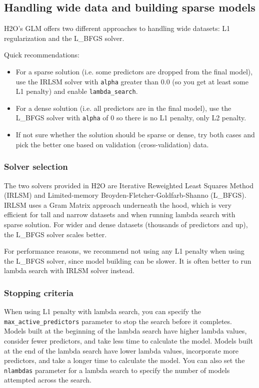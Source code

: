 \subsection{Handling wide data and building sparse models}

H2O's GLM offers two different approaches to handling wide datasets:  L1 regularization and the L\_BFGS solver.

Quick recommendations:

\begin{itemize}
\item For a sparse solution (i.e. some predictors are dropped from the final model), use the IRLSM solver with 
      \texttt{alpha} greater than 0.0 (so you get at least some L1 penalty) and enable \texttt{lambda\_search}.

\item For a dense solution (i.e. all predictors are in the final model), use the L\_BFGS solver with
      \texttt{alpha} of 0 so there is no L1 penalty, only L2 penalty.
\item If not sure whether the solution should be sparse or dense, try both cases and pick the better one based on validation (cross-validation) data.      
\end{itemize}

\subsubsection{Solver selection}

The two solvers provided in H2O are Iterative Reweighted Least Squares Method (IRLSM) and Limited-memory Broyden-Fletcher-Goldfarb-Shanno (L\_BFGS).  IRLSM uses
a Gram Matrix approach underneath the hood, which is very efficient for tall and narrow datasets and when running lambda search with sparse solution.  For wider and dense
datasets (thousands of predictors and up), the L\_BFGS solver scales better.

For performance reasons, we recommend not using any L1 penalty when using the L\_BFGS solver, since
model building can be slower. It is often better to run lambda search with IRLSM solver instead.

\subsubsection{Stopping criteria}

When using L1 penalty with lambda search, you can specify the \texttt{max\_active\_predictors} parameter to stop
the search before it completes.  Models built at the beginning of the lambda search have higher lambda values, consider fewer predictors, and take less time to calculate the model.  Models built at the end of the lambda search have
lower lambda values, incorporate more predictors, and take a longer time to calculate the model. You can also set the \texttt{nlambdas} parameter for a lambda search to specify the number of models attempted across the search.

